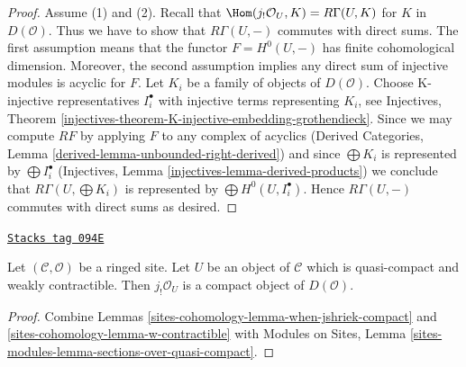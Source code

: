 \begin{proof}
Assume (1) and (2). Recall that $\Hom(j_!\mathcal{O}_U, K) = R\Gamma(U, K)$ for
$K$ in $D(\mathcal{O})$. Thus we have to show that $R\Gamma(U, -)$
commutes with direct sums. The first assumption means that the functor
$F = H^0(U, -)$ has finite cohomological dimension. Moreover, the second
assumption implies any direct sum of injective modules is acyclic for $F$.
Let $K_i$ be a family of objects of $D(\mathcal{O})$.
Choose K-injective representatives $I_i^\bullet$ with injective terms
representing $K_i$, see Injectives, Theorem
\ref{injectives-theorem-K-injective-embedding-grothendieck}.
Since we may compute $RF$ by applying $F$ to any complex of acyclics
(Derived Categories, Lemma \ref{derived-lemma-unbounded-right-derived})
and since $\bigoplus K_i$ is represented by $\bigoplus I_i^\bullet$
(Injectives, Lemma \ref{injectives-lemma-derived-products})
we conclude that $R\Gamma(U, \bigoplus K_i)$ is represented by
$\bigoplus H^0(U, I_i^\bullet)$. Hence $R\Gamma(U, -)$ commutes
with direct sums as desired.
\end{proof}

\begin{lemma}
\label{sites-cohomology-lemma-quasi-compact-weakly-contractible-compact}
\href{https://stacks.math.columbia.edu/tag/094E}{\texttt{Stacks tag 094E}}

Let $(\mathcal{C}, \mathcal{O})$ be a ringed site. Let $U$
be an object of $\mathcal{C}$ which is quasi-compact and
weakly contractible. Then
$j_!\mathcal{O}_U$ is a compact object of $D(\mathcal{O})$.
\end{lemma}

\begin{proof}
Combine Lemmas \ref{sites-cohomology-lemma-when-jshriek-compact} and
\ref{sites-cohomology-lemma-w-contractible} with
Modules on Sites, Lemma \ref{sites-modules-lemma-sections-over-quasi-compact}.
\end{proof}

